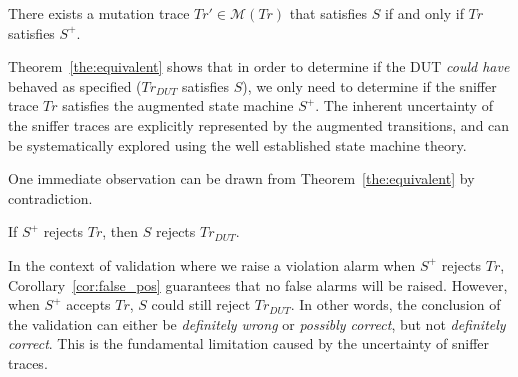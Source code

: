\begin{theorem}
  There exists a mutation trace $Tr' \in \mathcal{M}(Tr)$ that satisfies $S$ if
  and only if $Tr$ satisfies $S^+$.
 \label{the:equivalent}
\end{theorem}

Theorem~\ref{the:equivalent} shows that in order to determine if the DUT
\textit{could have} behaved as specified ($Tr_{DUT}$ satisfies $S$), we only
need to determine if the sniffer trace $Tr$ satisfies the augmented state
machine $S^+$.
%
The inherent uncertainty of the sniffer traces are explicitly represented by the
augmented transitions, and can be systematically explored using the well
established state machine theory.

One immediate observation can be drawn from Theorem~\ref{the:equivalent} by
contradiction.

\begin{corollary}
  If $S^+$ rejects $Tr$, then $S$ rejects $Tr_{DUT}$.
  \label{cor:false_pos}
\end{corollary}
%
In the context of validation where we raise a violation alarm when $S^+$
rejects $Tr$, Corollary~\ref{cor:false_pos} guarantees that no false alarms will be
raised.
%
However, when $S^+$ accepts $Tr$, $S$ could still reject $Tr_{DUT}$.
%
In other words, the conclusion of the validation can either be \textit{definitely
wrong} or \textit{possibly correct}, but not \textit{definitely correct}.
%
This is the fundamental limitation caused by the uncertainty of sniffer traces.
